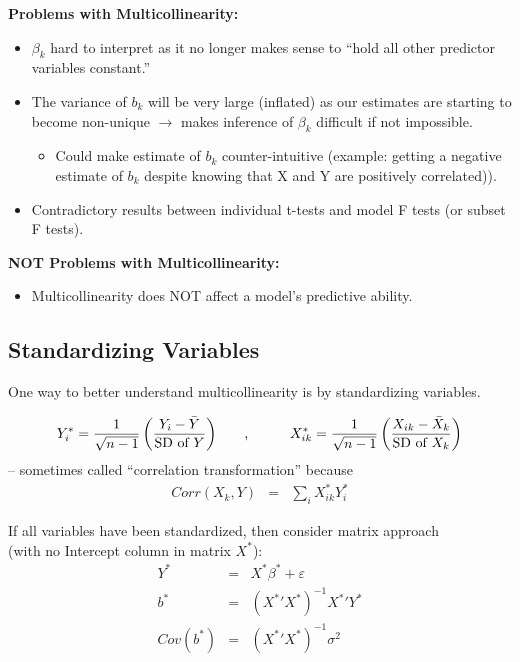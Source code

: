 \documentclass[12pt]{../notes}
\begin{document}
\textbf{Problems with Multicollinearity:}
\begin{itemize}
\item $\beta_k$ hard to interpret as it no longer makes sense to ``hold all other predictor variables constant.''
\item The variance of $b_k$ will be very large (inflated) as our estimates are starting to become non-unique $\rightarrow$ makes inference of $\beta_k$ difficult if not impossible. 
\begin{itemize}
\item Could make estimate of $b_k$ counter-intuitive (example: getting a negative estimate of $b_k$ despite knowing that X and Y are positively correlated)). 
\end{itemize}
\item Contradictory results between individual t-tests and model F tests (or subset F tests). 
\end{itemize}

\textbf{NOT Problems with Multicollinearity:}
\begin{itemize}
\item Multicollinearity does NOT affect a model's predictive ability. 
\end{itemize}

\subsection{Standardizing Variables}
One way to better understand multicollinearity is by standardizing variables. 

\begin{eqnarray}
Y^*_{i} = \frac{1}{\sqrt{n-1}} \left( \frac{Y_{i} - \bar{Y}}{\mbox{SD of $Y$}} \right)
 & \mbox{\hspace{2em},\hspace{2em}} &
X^*_{ik} = \frac{1}{\sqrt{n-1}} \left( \frac{X_{ik} - \bar{X}_k}{\mbox{SD of $X_k$}} \right)  \nonumber
\end{eqnarray}
-- sometimes called ``correlation transformation'' because
\begin{eqnarray}
  Corr(X_k,Y) & = & \sum_i X^*_{ik} Y^*_i \nonumber
\end{eqnarray}

If all variables have been standardized, then consider matrix approach\\
(with no Intercept column in matrix $X^*$):
\begin{eqnarray}
  Y^* & = & X^* \beta^* + \varepsilon \nonumber \\
  b^* & = & ( {X^*}' X^*)^{-1} {X^*}' Y^* \nonumber \\
  Cov(b^*) & = & ({X^*}' {X^*})^{-1} \sigma^2 \nonumber
\end{eqnarray}
\end{document}
